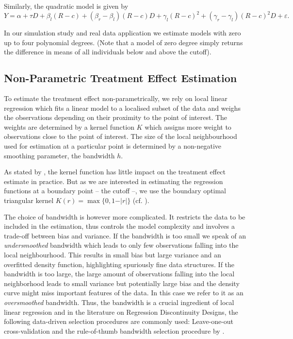 Similarly, the quadratic model is given by
\begin{equation}
Y = \alpha + \tau D + \beta_{l} (R-c) + (\beta_{r} - \beta_{l}) (R-c) D + \gamma_{l} (R-c)^2 + (\gamma_{r} - \gamma_{l}) (R-c)^2 D + \varepsilon .
\end{equation}

In our simulation study and real data application we estimate models with zero up to four polynomial degrees. (Note that a model of zero degree simply returns the difference in means of all individuals below and above the cutoff).



\subsection{Non-Parametric Treatment Effect Estimation} %
\label{sec: non-param}
To estimate the treatment effect non-parametrically, we rely on local linear regression which fits a linear model to a localised subset of the data and weighs the observations depending on their proximity to the point of interest. The weights are determined by a kernel function $K$ which assigns more weight to observations close to the point of interest. The size of the local neighbourhood used for estimation at a particular point is determined by a non-negative smoothing parameter, the bandwidth $h$.

As stated by \cite{lee_lemieux}, the kernel function has little impact on the treatment effect estimate in practice. But as we are interested in estimating the regression functions at a boundary point -- the cutoff --, we use the boundary optimal triangular kernel $K(r) = \max \lbrace 0, 1 - \vert r \vert \rbrace$ (cf. \cite{cheng_et_al}).

The choice of bandwidth is however more complicated. It restricts the data to be included in the estimation, thus controls the model complexity and involves a trade-off between bias and variance. If the bandwidth is too small we speak of an \textit{undersmoothed} bandwidth which leads to only few observations falling into the local neighbourhood. This results in small bias but large variance and an overfitted density function, highlighting spuriously fine data structures. If the bandwidth is too large, the large amount of observations falling into the local neighborhood leads to small variance but potentially large bias and the density curve might miss important features of the data. In this case we refer to it as an \textit{oversmoothed} bandwidth. Thus, the bandwidth is a crucial ingredient of local linear regression and in the literature on Regression Discontinuity Designs, the following data-driven selection procedures are commonly used: Leave-one-out cross-validation and the rule-of-thumb bandwidth selection procedure by \cite{fan_gij}.


